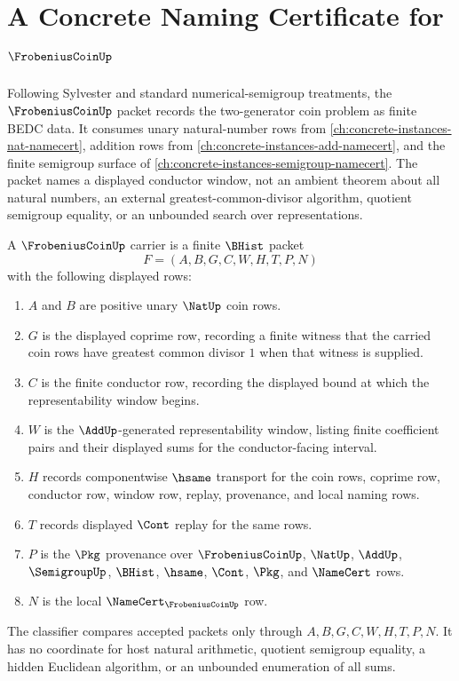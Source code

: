 \chapter{A Concrete Naming Certificate for $\FrobeniusCoinUp$}
\label{ch:concrete-instances-frobenius-coin-namecert}

Following Sylvester and standard numerical-semigroup treatments, the $\FrobeniusCoinUp$ packet records the two-generator coin problem as finite BEDC data. It consumes unary natural-number rows from \autoref{ch:concrete-instances-nat-namecert}, addition rows from \autoref{ch:concrete-instances-add-namecert}, and the finite semigroup surface of \autoref{ch:concrete-instances-semigroup-namecert}. The packet names a displayed conductor window, not an ambient theorem about all natural numbers, an external greatest-common-divisor algorithm, quotient semigroup equality, or an unbounded search over representations.

\begin{definition}
\label{def:frobenius-coin-carrier}
A $\FrobeniusCoinUp$ carrier is a finite $\BHist$ packet
$$
F=(A,B,G,C,W,H,T,P,N)
$$
with the following displayed rows:
\begin{enumerate}
\item $A$ and $B$ are positive unary $\NatUp$ coin rows.
\item $G$ is the displayed coprime row, recording a finite witness that the carried coin rows have greatest common divisor $1$ when that witness is supplied.
\item $C$ is the finite conductor row, recording the displayed bound at which the representability window begins.
\item $W$ is the $\AddUp$-generated representability window, listing finite coefficient pairs and their displayed sums for the conductor-facing interval.
\item $H$ records componentwise $\hsame$ transport for the coin rows, coprime row, conductor row, window row, replay, provenance, and local naming rows.
\item $T$ records displayed $\Cont$ replay for the same rows.
\item $P$ is the $\Pkg$ provenance over $\FrobeniusCoinUp$, $\NatUp$, $\AddUp$, $\SemigroupUp$, $\BHist$, $\hsame$, $\Cont$, $\Pkg$, and $\NameCert$ rows.
\item $N$ is the local $\NameCert_{\FrobeniusCoinUp}$ row.
\end{enumerate}
The classifier compares accepted packets only through $A,B,G,C,W,H,T,P,N$. It has no coordinate for host natural arithmetic, quotient semigroup equality, a hidden Euclidean algorithm, or an unbounded enumeration of all sums.
\end{definition}

